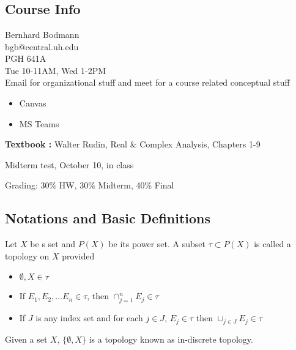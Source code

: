 
\chapter{}

\section{Course Info}
Bernhard Bodmann \\
bgb@central.uh.edu \\
PGH 641A \\
Tue 10-11AM, Wed 1-2PM \\

Email for organizational stuff and meet for a course related conceptual stuff

\begin{itemize}
  \item Canvas
  \item MS Teams
\end{itemize}

\textbf{Textbook :} Walter Rudin, Real \& Complex Analysis, Chapters 1-9

Midterm test, October 10, in class

Grading: 30\% HW, 30\% Midterm, 40\% Final

\section{Notations and Basic Definitions}

\begin{definition}
  Let $X$ be s set and $P(X)$ be its power set. A subset $\tau \subset P(X)$ is called a topology on $X$ provided
  \begin{itemize}
    \item $\emptyset, X \in \tau$
    \item If $E_1, E_2, \ldots E_n \in \tau$, then $\cap_{j = 1}^{n}E_j \in \tau$
    \item If $J$ is any index set and for each $j  \in  J$, $E_j \in \tau$ then $ \cup_{j \in J} E_j \in \tau$
  \end{itemize}
\end{definition}

\begin{example}
  Given a set $X$, $\{ \emptyset, X \}$ is a topology known as in-discrete topology.
\end{example}

